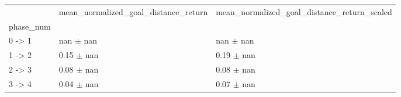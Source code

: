 \begin{tabular}{lll}
\toprule
 & mean_normalized_goal_distance_return & mean_normalized_goal_distance_return_scaled \\
phase_num &  &  \\
\midrule
0 -> 1 & nan $\pm$ nan & nan $\pm$ nan \\
1 -> 2 & 0.15 $\pm$ nan & 0.19 $\pm$ nan \\
2 -> 3 & 0.08 $\pm$ nan & 0.08 $\pm$ nan \\
3 -> 4 & 0.04 $\pm$ nan & 0.07 $\pm$ nan \\
\bottomrule
\end{tabular}
